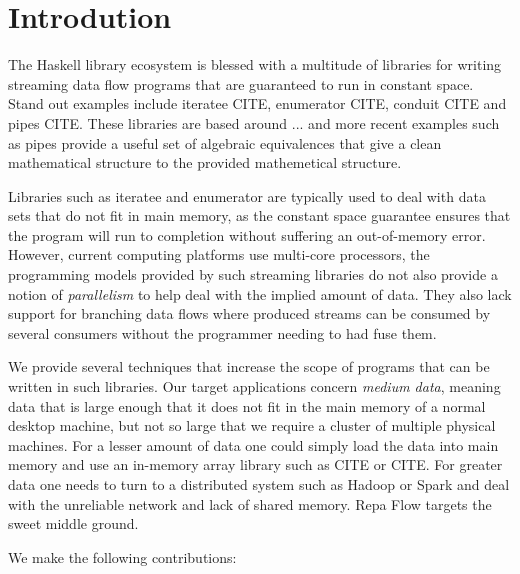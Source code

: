 \section{Introdution}

The Haskell library ecosystem is blessed with a multitude of libraries for writing streaming data flow programs that are guaranteed to run in constant space. Stand out examples include iteratee CITE, enumerator CITE, conduit CITE and pipes CITE. These libraries are based around ... and more recent examples such as pipes provide a useful set of algebraic equivalences that give a clean mathematical structure to the provided mathemetical structure.

Libraries such as iteratee and enumerator are typically used to deal with data sets that do not fit in main memory, as the constant space guarantee ensures that the program will run to completion without suffering an out-of-memory error. However, current computing platforms use multi-core processors, the programming models provided by such streaming libraries do not also provide a notion of \emph{parallelism} to help deal with the implied amount of data. They also lack support for branching data flows where produced streams can be consumed by several consumers without the programmer needing to had fuse them.

We provide several techniques that increase the scope of programs that can be written in such libraries. Our target applications concern \emph{medium data}, meaning data that is large enough that it does not fit in the main memory of a normal desktop machine, but not so large that we require a cluster of multiple physical machines. For a lesser amount of data one could simply load the data into main memory and use an in-memory array library such as CITE or CITE. For greater data one needs to turn to a distributed system such as Hadoop or Spark and deal with the unreliable network and lack of shared memory. Repa Flow targets the sweet middle ground.

We make the following contributions:

